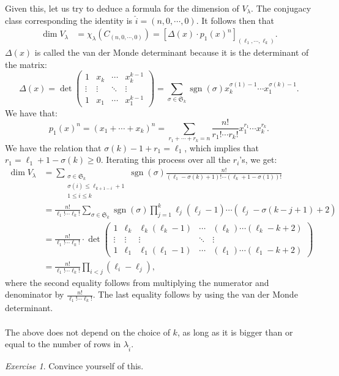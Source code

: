 \documentclass[a4paper]{report}
\theoremstyle{definition}
\theoremstyle{remark}
\theoremstyle{proposition}
\theoremstyle{conjecture}
\theoremstyle{lemma}
\theoremstyle{corollary}
\theoremstyle{exercise}
\newtheorem{exercise}{Exercise}
\theoremstyle{example}
\newcommand{\on}{\operatorname}
\begin{document}
Given this, let us try to deduce a formula for the dimension of $V_\lambda$.
The conjugacy class corresponding the identity is $\widehat{i} = (n,0,\cdots,0)$.
It follows then that 
\begin{align*}
    \dim V_\lambda &= \chi_\lambda(C_{(n,0,\cdots,0)}) = \left[ \Delta(x) \cdot p_1(x)^n \right]_{(\ell_1,\cdots,\ell_k)}.
\end{align*}
$\Delta(x)$ is called the van der Monde determinant because it is the 
determinant of the matrix:
$$\Delta(x) = \det \begin{pmatrix}
    1 & x_k & \cdots & x_k^{k-1}\\
    \vdots  &\vdots & \ddots & \vdots  \\
    1 & x_1 & \cdots & x_1^{k-1}
\end{pmatrix} = \sum_{\sigma\in\mathfrak{S}_k} \on{sgn}(\sigma) x_k^{\sigma(1)-1}\cdots x_1^{\sigma(k)-1}.$$
We have that:
$$p_1(x)^n = (x_1+\cdots+x_k)^n = \sum_{r_1+\cdots+r_k=n}\frac{n!}{r_1!\cdots r_k!} x_1^{r_1}\cdots x_k^{r_k}.$$
We have the relation that 
$\sigma(k)-1+r_1 = \ell_1$, which implies that 
$r_1 = \ell_1 + 1 - \sigma(k) \geq 0$. Iterating this process over 
all the $r_i$'s, we get:
\begin{align*}
    \dim V_\lambda &= \sum_{\substack{\sigma \in \mathfrak{S}_k\\ \sigma(i) \leq \ell_{k+1-i} + 1\\1\leq i \leq k}}\on{sgn}(\sigma) \frac{n!}{(\ell_1-\sigma(k)+1)! \cdots (\ell_k + 1 -\sigma(1))!}\\
                   &= \frac{n!}{\ell_1!\cdots \ell_k!} \sum_{\sigma\in\mathfrak{S}_k} \on{sgn}(\sigma) \prod_{j=1}^k \ell_j(\ell_j-1)\cdots (\ell_j-\sigma(k-j+1)+2)\\
                   &= \frac{n!}{\ell_1!\cdots\ell_k!} \cdot\det \begin{pmatrix}
                       1 & \ell_k & \ell_k(\ell_k-1) & \cdots & (\ell_k)\cdots (\ell_k-k+2)\\
                       \vdots & \vdots & \vdots & \ddots & \vdots\\
                       1 & \ell_1 & \ell_1(\ell_1-1) & \cdots & (\ell_1)\cdots(\ell_1-k+2)
                   \end{pmatrix}\\
                   &= \frac{n!}{\ell_1!\cdots\ell_k!} \prod_{i<j} (\ell_i-\ell_j),
\end{align*}
where the second equality follows from multiplying the numerator and denominator
by $\frac{n!}{\ell_1!\cdots \ell_k!}$. The last equality 
follows by using the van der Monde determinant.\\\\
The above does not depend on the choice of $k$, as long as it is bigger than or 
equal to the number of rows in $\lambda_{\widehat{i}}$.
\begin{exercise}
    Convince yourself of this.
\end{exercise}
\end{document}
